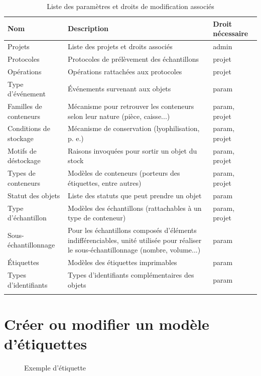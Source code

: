 \begin{longtable}{|p{4cm}|p{8cm}| p{3cm}|}
\hline
\textbf{Nom} & \textbf{Description} & \textbf{Droit nécessaire} \\
\hline
\endhead
Projets & Liste des projets et droits associés & admin \\
\hline
Protocoles & Protocoles de prélèvement des échantillons & projet \\
\hline
Opérations & Opérations rattachées aux protocoles & projet \\
\hline
Type d'événement & Événements survenant aux objets & param \\
\hline
Familles de conteneurs & Mécanisme pour retrouver les conteneurs selon leur nature (pièce, caisse...) & param, projet\\
\hline
Conditions de stockage & Mécanisme de conservation (lyophilisation, p. e.) & param, projet\\
\hline
Motifs de déstockage & Raisons invoquées pour sortir un objet du stock & param, projet\\
\hline
Types de conteneurs & Modèles de conteneurs (porteurs des étiquettes, entre autres) & param, projet\\
\hline
Statut des objets & Liste des statuts que peut prendre un objet & param\\
\hline
Type d'échantillon & Modèles des échantillons (rattachables à un type de conteneur) &  param, projet\\
\hline
Sous-échantillonnage & Pour les échantillons composés d'éléments indifférenciables, unité utilisée pour réaliser le sous-échantillonnage (nombre, volume...) & param \\
\hline
Étiquettes & Modèles des étiquettes imprimables & param \\
\hline
Types d'identifiants & Types d'identifiants complémentaires des objets & param \\
\hline

\caption{Liste des paramètres et droits de modification associés}
\end{longtable}

\section{Créer ou modifier un modèle d'étiquettes}

\begin{figure}[H]
\centering
{}
\caption{Exemple d'étiquette}
\end{figure}

